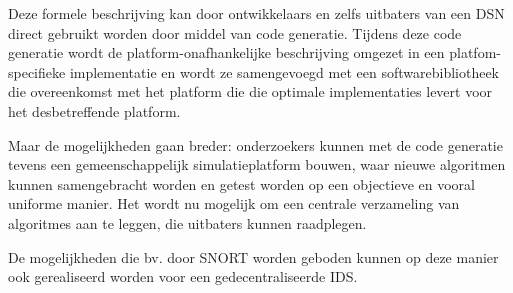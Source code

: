 Deze formele beschrijving kan door ontwikkelaars en zelfs uitbaters van een DSN
direct gebruikt worden door middel van code generatie. Tijdens deze code
generatie wordt de platform-onafhankelijke beschrijving omgezet in een
platfom-specifieke implementatie en wordt ze samengevoegd met een
softwarebibliotheek die overeenkomst met het platform die die optimale
implementaties levert voor het desbetreffende platform.

Maar de mogelijkheden gaan breder: onderzoekers kunnen met de code generatie
tevens een gemeenschappelijk simulatieplatform bouwen, waar nieuwe algoritmen
kunnen samengebracht worden en getest worden op een objectieve en vooral
uniforme manier. Het wordt nu mogelijk om een centrale verzameling van
algoritmes aan te leggen, die uitbaters kunnen raadplegen.

De mogelijkheden die bv. door SNORT worden geboden kunnen op deze manier ook
gerealiseerd worden voor een gedecentraliseerde IDS.
